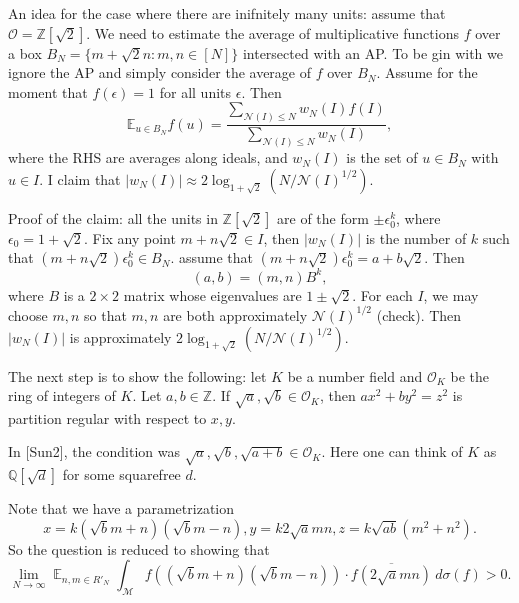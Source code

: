 \documentclass[11pt]{amsart}
\theoremstyle{definition}
\DeclareMathOperator*{\E}{\mathbb{E}}
\newcommand{\NN}{{\mathcal N}}
\newcommand{\Q}{{\mathbb Q}}
\newcommand{\Z}{{\mathbb Z}}
\newcommand{\e}{\epsilon}
\begin{document}
An idea for the case where there are inifnitely many units: assume that $\mathcal{O}=\Z[\sqrt{2}]$. We need to estimate the average of multiplicative functions $f$ over a box $B_{N}=\{m+\sqrt{2}n\colon m,n\in [N]\}$ intersected with an AP. To be gin with we ignore the AP and simply consider the average of  $f$ over $B_{N}$. {\color{red} Assume for the moment that $f(\e)=1$ for all units $\e$}. Then 
$$\mathbb{E}_{u\in B_{N}}f(u)=\frac{\sum_{\NN(I)\leq N}w_{N}(I)f(I)}{\sum_{\NN(I)\leq N}w_{N}(I)},$$
where the RHS are averages along ideals, and 
$w_{N}(I)$ is the set of $u\in B_{N}$ with $u\in I$. I claim that $\vert w_{N}(I)\vert\approx 2\log_{1+\sqrt{2}}(N/\NN(I)^{1/2})$. 



Proof of the claim: all the units in $\Z[\sqrt{2}]$ are of the form $\pm\epsilon_{0}^{k}$, where $\epsilon_{0}=1+\sqrt{2}$. Fix any point $m+n\sqrt{2}\in I$, then $\vert w_{N}(I)\vert$ is the number of $k$ such that $(m+n\sqrt{2})\epsilon_{0}^{k}\in B_{N}$. assume that $(m+n\sqrt{2})\epsilon_{0}^{k}=a+b\sqrt{2}$. Then 
$$(a,b)=(m,n)B^{k},$$
where $B$ is a $2\times 2$ matrix whose eigenvalues are $1\pm \sqrt{2}$. For each $I$, we may choose $m,n$ so that $m,n$ are both approximately $\NN(I)^{1/2}$ (check). Then $\vert w_{N}(I)\vert$ is approximately $2\log_{1+\sqrt{2}}(N/\NN(I)^{1/2})$.

The next step is to show the following:
let $K$ be a number field and $\mathcal{O}_{K}$ be the ring of integers of $K$. Let $a,b\in\Z$.
If $\sqrt{a},\sqrt{b}\in \mathcal{O}_{K}$, then $ax^{2}+by^{2}=z^{2}$ is partition regular with respect to $x,y$.

In [Sun2], the condition was $\sqrt{a},\sqrt{b},\sqrt{a+b}\in \mathcal{O}_{K}$. Here one can think of $K$ as $\Q[\sqrt{d}]$ for some squarefree $d$.


Note that we have a parametrization 
$$x=k(\sqrt{b}m+n)(\sqrt{b}m-n), y=k2\sqrt{a}mn, z=k\sqrt{ab}(m^{2}+n^{2}).$$
So the question is reduced to showing that 
\begin{equation}\nonumber
    \lim_{N \to \infty} \E_{n,m \in R'_{N}}\int_{\mathcal{M}} f((\sqrt{b}m+n)(\sqrt{b}m-n)) \cdot \overline{f(2\sqrt{a}mn)} \ d\sigma(f)>0.
\end{equation}
\end{document}
